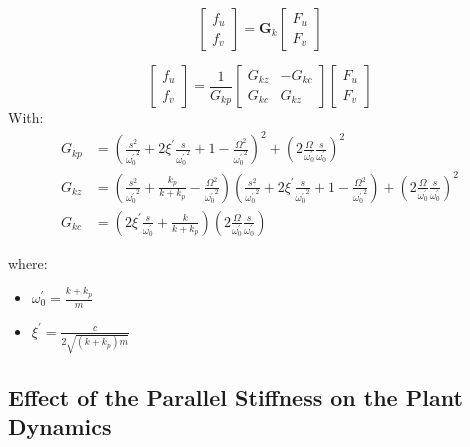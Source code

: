 \documentclass{ISMA_USD2020}
\begin{document}
\begin{equation}
\begin{bmatrix} f_u \\ f_v \end{bmatrix} =
\bm{G}_k
\begin{bmatrix} F_u \\ F_v \end{bmatrix}
\end{equation}

\begin{equation}
\begin{bmatrix} f_u \\ f_v \end{bmatrix} =
\frac{1}{G_{kp}}
\begin{bmatrix}
   G_{kz} & -G_{kc} \\
   G_{kc} &  G_{kz}
\end{bmatrix}
\begin{bmatrix} F_u \\ F_v \end{bmatrix}
\end{equation}
With:
\begin{align}
  G_{kp} &= \left( \frac{s^2}{{\omega_0^\prime}^2} + 2\xi^\prime \frac{s}{{\omega_0^\prime}^2} + 1 - \frac{\Omega^2}{{\omega_0^\prime}^2} \right)^2 + \left( 2 \frac{\Omega}{\omega_0^\prime}\frac{s}{\omega_0^\prime} \right)^2 \\
  G_{kz} &= \left( \frac{s^2}{{\omega_0^\prime}^2} + \frac{k_p}{k + k_p} - \frac{\Omega^2}{{\omega_0^\prime}^2} \right) \left( \frac{s^2}{{\omega_0^\prime}^2} + 2\xi^\prime \frac{s}{{\omega_0^\prime}^2} + 1 - \frac{\Omega^2}{{\omega_0^\prime}^2} \right) + \left( 2 \frac{\Omega}{\omega_0^\prime}\frac{s}{\omega_0^\prime} \right)^2 \\
  G_{kc} &= \left( 2 \xi^\prime \frac{s}{\omega_0^\prime} + \frac{k}{k + k_p} \right) \left( 2 \frac{\Omega}{\omega_0^\prime}\frac{s}{\omega_0^\prime} \right)
\end{align}

where:
\begin{itemize}
\item \(\omega_0^\prime = \frac{k + k_p}{m}\)
\item \(\xi^\prime = \frac{c}{2 \sqrt{(k + k_p) m}}\)
\end{itemize}

\subsection{Effect of the Parallel Stiffness on the Plant Dynamics}
\label{sec:org3ec34fe}
\end{document}
